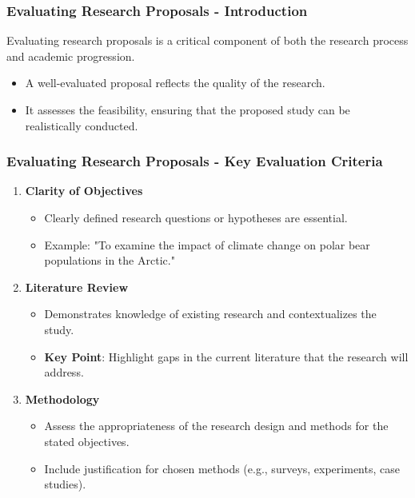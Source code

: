 \documentclass[aspectratio=169]{beamer}
\begin{document}
\begin{frame}[fragile]
    \frametitle{Evaluating Research Proposals - Introduction}
    Evaluating research proposals is a critical component of both the research process and academic progression. 
    \begin{itemize}
        \item A well-evaluated proposal reflects the quality of the research.
        \item It assesses the feasibility, ensuring that the proposed study can be realistically conducted.
    \end{itemize}
\end{frame}

\begin{frame}[fragile]
    \frametitle{Evaluating Research Proposals - Key Evaluation Criteria}
    \begin{enumerate}
        \item \textbf{Clarity of Objectives}
            \begin{itemize}
                \item Clearly defined research questions or hypotheses are essential.
                \item Example: "To examine the impact of climate change on polar bear populations in the Arctic."
            \end{itemize}
        
        \item \textbf{Literature Review}
            \begin{itemize}
                \item Demonstrates knowledge of existing research and contextualizes the study.
                \item \textbf{Key Point}: Highlight gaps in the current literature that the research will address.
            \end{itemize}
        
        \item \textbf{Methodology}
            \begin{itemize}
                \item Assess the appropriateness of the research design and methods for the stated objectives.
                \item Include justification for chosen methods (e.g., surveys, experiments, case studies).
            \end{itemize}
    \end{enumerate}
\end{frame}
\end{document}

